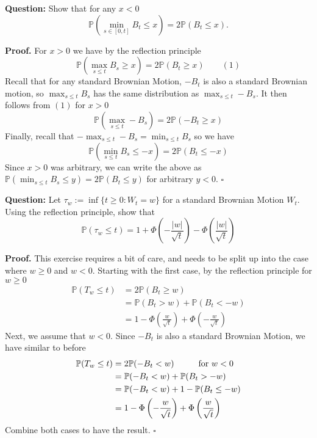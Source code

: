 \documentclass{article}
\begin{document}
\begin{tcolorbox}[colframe=black,colback=gray!5,boxrule=0.5pt]
\textbf{Question:} Show that for any $x<0$ 
$$\mathbb{P}(\min_{s\in[0,t]} B_t\leq x) = 2\mathbb{P}(B_t\leq x).$$
\end{tcolorbox}
\textbf{Proof.} For $x > 0$ we have by the reflection principle 
$$\mathbb{P}(\max_{s\leq t}B_s\geq x) = 2\mathbb{P}(B_t\geq x)\quad\quad (1)$$
Recall that for any standard Brownian Motion, $-B_t$ is also a standard Brownian motion, so $\max_{s\leq t}B_s$ has the same distribution as $\max_{s\leq t}-B_s$. It then follows from $(1)$ for $x>0$
$$\mathbb{P}(\max_{s\leq t}-B_s) = 2\mathbb{P}(-B_t\geq x)$$
Finally, recall that $-\max_{s\leq t} -B_s = \min_{s\leq t} B_s$ so we have 
$$\mathbb{P}(\min_{s\leq t}B_s\leq-x) = 2\mathbb{P}(B_t\leq -x)$$
Since $x>0$ was arbitrary, we can write the above as $\mathbb{P}(\min_{s\leq t}B_s\leq y) = 2\mathbb{P}(B_t\leq y)$ for arbitrary $y<0$. $\square$


\begin{tcolorbox}[colframe=black,colback=gray!5,boxrule=0.5pt]
\textbf{Question:} Let $\tau_w :=\inf\{t\geq 0 : W_t=w\}$ for a standard Brownian Motion $W_t$. Using the reflection principle, show that 
$$\mathbb{P}(\tau_w\leq t) = 1 + \Phi\left(-\frac{|w|}{\sqrt{t}}\right) - \Phi\left(\frac{|w|}{\sqrt{t}}\right)$$
\end{tcolorbox}
\textbf{Proof.} This exercise requires a bit of care, and needs to be split up into the case where $w\geq0$ and $w<0$. Starting with the first case, by the reflection principle for $w\geq0$
\begin{align*}
    \mathbb{P}(T_w\leq t) &= 2\mathbb{P}(B_t\geq w)  \\
    &= \mathbb{P}(B_t > w) + \mathbb{P}(B_t < -w) \\
    &= 1 - \Phi\left(\frac{w}{\sqrt{t}}\right) + \Phi\left(-\frac{w}{\sqrt{t}}\right)
\end{align*}
Next, we assume that $w < 0$. Since $-B_t$ is also a standard Brownian Motion, we have similar to before 
\begin{align*}
    \mathbb{P}(T_w\leq t)&= 2\mathbb{P}(-B_t<w) \hspace{10mm} \text{for $w<0$} \\
    &= \mathbb{P}(-B_t<w) + \mathbb{P}(B_t > -w) \\
    &= \mathbb{P}(-B_t<w) + 1-\mathbb{P}(B_t\leq-w) \\
    &= 1-\Phi\left(-\frac{w}{\sqrt{t}}\right)+\Phi\left(\frac{w}{\sqrt{t}}\right)
\end{align*}
Combine both cases to have the result. $\square$
\end{document}
